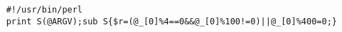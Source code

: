 \documentclass{article}
\begin{document}
	\begin{lstlisting}
	#!/usr/bin/perl
	print S(@ARGV);sub S{$r=(@_[0]%4==0&&@_[0]%100!=0)||@_[0]%400=0;}
	\end{lstlisting}
	
\end{document}
